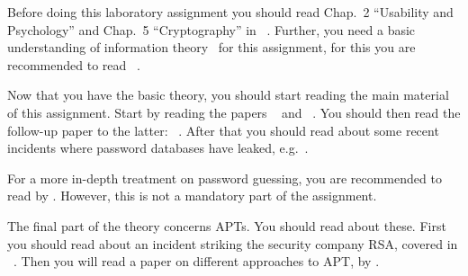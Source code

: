 Before doing this laboratory assignment you should read Chap.~2 ``Usability and 
Psychology'' and Chap.~5 ``Cryptography'' in 
~\cite{Anderson2008sea}.
Further, you need a basic understanding of information 
theory~\cite{Shannon1948amt} for this assignment, for this you are recommended 
to read ~\cite{Ueltschi2013se}.

Now that you have the basic theory, you should start reading the main material 
of this assignment.
Start by reading the papers ~\cite{Kuo2006hso} and 
~\cite{Komanduri2011opa}.
You should then read the follow-up paper to the latter: 
~\cite{Komanduri2014can}.
After that you should read about some recent incidents where password databases 
have leaked, 
e.g.~\cite{Hunt2011abs,Cluley2012twp,Oberheide2010bao,Cubrilovic2009rhf}.

For a more in-depth treatment on password guessing, you are recommended to read 
 by \citet{Bonneau2012ghs}.
However, this is not a mandatory part of the assignment.

The final part of the theory concerns \acp{APT}.
You should read about these.
First you should read about an incident striking the security company RSA, 
covered in ~\cite{Fisher2011rsa}.
Then you will read a paper on different approaches to \ac{APT}, 
 by \citet{Juels2012sha}.
